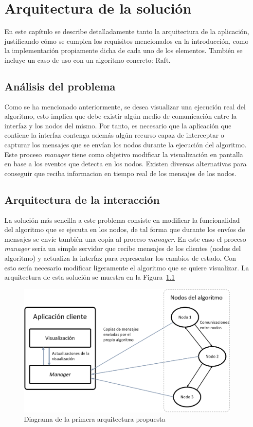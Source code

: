 \chapter{Arquitectura de la solución}

En este capítulo se describe detalladamente tanto la arquitectura de la aplicación, justificando cómo se cumplen los requisitos mencionados en la introducción, como la implementación propiamente dicha de cada uno de los elementos. También se incluye un caso de uso con un algoritmo concreto: Raft\cite{10.5555/2643634.2643666}.

\section{Análisis del problema}

Como se ha mencionado anteriormente, se desea visualizar una ejecución real del algoritmo, esto implica que debe existir algún medio de comunicación entre la interfaz y los nodos del mismo. Por tanto, es necesario que la aplicación que contiene la interfaz contenga además algún recurso capaz de interceptar o capturar los mensajes que se envían los nodos durante la ejecución del algoritmo. Este proceso \textit{manager} tiene como objetivo modificar la visualización en pantalla en base a los eventos que detecta en los nodos. Existen diversas alternativas para conseguir que reciba informacion en tiempo real de los mensajes de los nodos.

\section{Arquitectura de la interacción}
\label{sec:arquitectura}

La solución más sencilla a este problema consiste en modificar la funcionalidad del algoritmo que se ejecuta en los nodos, de tal forma que durante los envíos de mensajes se envíe también una copia al proceso \textit{manager}. En este caso el proceso \textit{manager} sería un simple servidor que recibe mensajes de los clientes (nodos del algoritmo) y actualiza la interfaz para representar los cambios de estado. Con esto sería necesario modificar ligeramente el algoritmo que se quiere visualizar. La arquitectura de esta solución se muestra en la Figura~\ref{fig:arquitectura1}

\newpage

\begin{figure}[h]
  \centering
  \includegraphics[width=0.7\linewidth]{imagenes/arquitectura1}
  \caption{Diagrama de la primera arquitectura propuesta}
  \label{fig:arquitectura1}
\end{figure}

